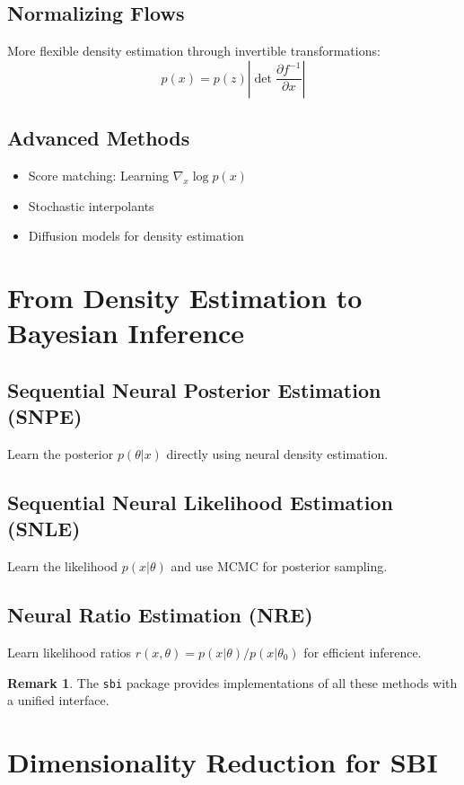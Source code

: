 \documentclass[11pt,a4paper]{article}
\theoremstyle{definition}
\newtheorem*{remark}{Remark}
\begin{document}
\subsection{Normalizing Flows}
More flexible density estimation through invertible transformations:
\begin{equation}
    p(x) = p(z) \left| \det \frac{\partial f^{-1}}{\partial x} \right|
\end{equation}

\subsection{Advanced Methods}
\begin{itemize}
    \item Score matching: Learning $\nabla_x \log p(x)$
    \item Stochastic interpolants
    \item Diffusion models for density estimation
\end{itemize}

\section{From Density Estimation to Bayesian Inference}

\subsection{Sequential Neural Posterior Estimation (SNPE)}
Learn the posterior $p(\theta|x)$ directly using neural density estimation.

\subsection{Sequential Neural Likelihood Estimation (SNLE)}
Learn the likelihood $p(x|\theta)$ and use MCMC for posterior sampling.

\subsection{Neural Ratio Estimation (NRE)}
Learn likelihood ratios $r(x,\theta) = p(x|\theta) / p(x|\theta_0)$ for efficient inference.

\begin{remark}
The \texttt{sbi} package provides implementations of all these methods with a unified interface.
\end{remark}

\section{Dimensionality Reduction for SBI}
\end{document}
